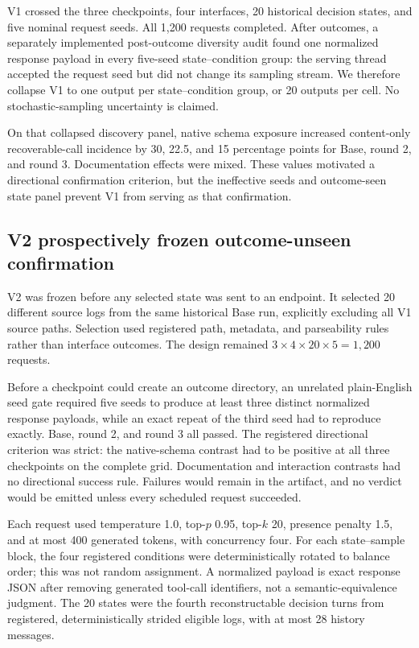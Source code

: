 \documentclass[10pt]{article}
\begin{document}
V1 crossed the three checkpoints, four interfaces, 20 historical decision
states, and five nominal request seeds. All 1,200 requests completed. After
outcomes, a separately implemented post-outcome diversity audit found one normalized response payload in every
five-seed state--condition group: the serving thread accepted the request seed
but did not change its sampling stream. We therefore collapse V1 to one output
per state--condition group, or 20 outputs per cell. No stochastic-sampling
uncertainty is claimed.

On that collapsed discovery panel, native schema exposure increased
content-only recoverable-call incidence by 30, 22.5, and 15 percentage points
for Base, round 2, and round 3. Documentation effects were mixed. These values
motivated a directional confirmation criterion, but the ineffective seeds and
outcome-seen state panel prevent V1 from serving as that confirmation.

\subsection{V2 prospectively frozen outcome-unseen confirmation}

V2 was frozen before any selected state was sent to an endpoint. It selected 20
different source logs from the same historical Base run, explicitly excluding
all V1 source paths. Selection used registered path, metadata, and parseability
rules rather than interface outcomes. The design remained
$3\times4\times20\times5=1{,}200$ requests.

Before a checkpoint could create an outcome directory, an unrelated
plain-English seed gate required five seeds to produce at least three distinct
normalized response payloads, while an exact repeat of the third seed had to
reproduce exactly.
Base, round 2, and round 3 all passed. The registered directional criterion was
strict: the native-schema contrast had to be positive at all three checkpoints
on the complete grid. Documentation and interaction contrasts had no directional
success rule. Failures would remain in the artifact, and no verdict would be
emitted unless every scheduled request succeeded.

Each request used temperature 1.0, top-$p$ 0.95, top-$k$ 20, presence penalty
1.5, and at most 400 generated tokens, with concurrency four. For each
state--sample block, the four registered conditions were deterministically
rotated to balance order; this was not random assignment. A normalized payload
is exact response JSON after removing generated tool-call identifiers, not a
semantic-equivalence judgment. The 20 states were the fourth reconstructable
decision turns from registered, deterministically strided eligible logs, with
at most 28 history messages.
\end{document}
